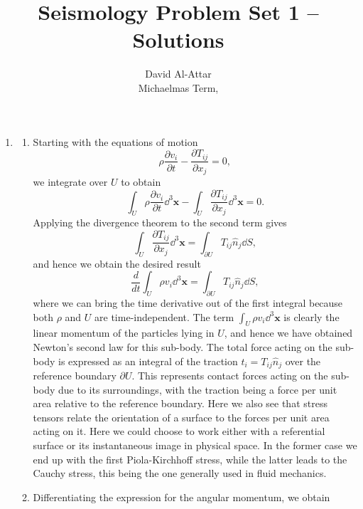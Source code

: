 \documentclass[a4paper,10pt]{paper}
\title{Seismology Problem Set 1 – Solutions}
\author{David Al-Attar \\ Michaelmas Term, \the\year}
\begin{document}
\maketitle

\begin{enumerate}

    \item 
    \begin{enumerate}
\item Starting with the equations of motion
\begin{equation*}
    \rho\frac{\partial v_{i}}{\partial t}-\frac{\partial T_{ij}}{\partial x_{j}}=0,
\end{equation*}
we integrate over $U$ to obtain
\begin{equation*}
    \int_{U}\rho\frac{\partial v_{i}}{\partial t}\dd^{3}\mathbf{x}-\int_{U}\frac{\partial T_{ij}}{\partial x_{j}}\dd^{3}\mathbf{x}=0.
\end{equation*}
Applying the divergence theorem to the second term gives
\begin{equation*}
    \int_{U}\frac{\partial T_{ij}}{\partial x_{j}}\dd^{3}\mathbf{x}=\int_{\partial U}T_{ij}\hat{n}_{j}\dd S,
\end{equation*}
and hence we obtain the desired result
\begin{equation*}
    \frac{d}{dt}\int_{U}\rho v_{i}\dd^{3}\mathbf{x}=\int_{\partial U}T_{ij}\hat{n}_{j}\dd S,
\end{equation*}
where we can bring the time derivative out of the first integral because both $\rho$ and $U$ are time-independent. The term $\int_{U}\rho v_{i}\dd^{3}\mathbf{x}$ is clearly the linear momentum of the particles lying in $U$, and hence we have obtained Newton's second law for this sub-body. The total force acting on the sub-body is expressed as an integral of the traction $t_{i}=T_{ij}\hat{n}_{j}$ over the reference boundary $\partial U$. This represents contact forces acting on the sub-body due to its surroundings, with the traction being a force per unit area relative to the reference boundary. Here we also see that stress tensors relate the orientation of a surface to the forces per unit area acting on it. Here we could choose to work either with a referential surface or its instantaneous image in physical space. In the former case we end up with the first Piola-Kirchhoff stress, while the latter leads to the Cauchy stress, this being the one generally used in fluid mechanics.
\item
Differentiating the expression for the angular momentum, we obtain

\end{enumerate}
\end{enumerate}
\end{document}
